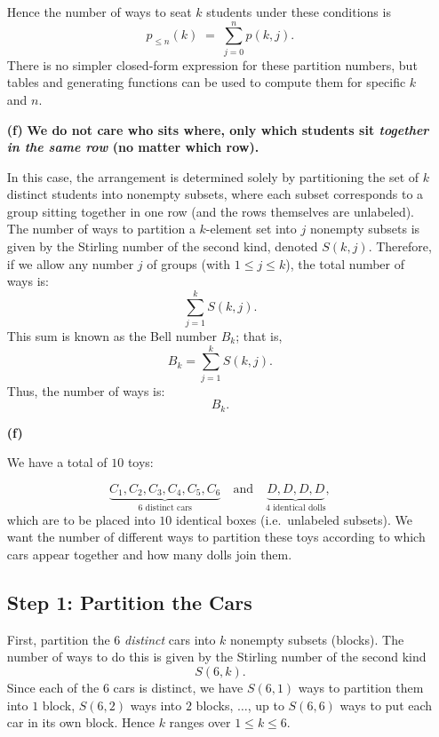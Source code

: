 \documentclass[docmute]{article}
\begin{document}
\begin{enumerate}
    Hence the number of ways to seat \(k\) students under these conditions is
    \[
      \boxed{
        p_{\le n}(k) \;=\;\sum_{j=0}^n p(k,j).
      }
    \]
    There is no simpler closed‐form expression for these partition numbers, but tables and generating functions can be used to compute them for specific \(k\) and \(n\). 
    

    \item[\textbf{(f)}]
    \textbf{We do not care who sits where, only which students sit \emph{together in the same row} (no matter which row).}
    
    In this case, the arrangement is determined solely by partitioning the set of \(k\) distinct students into nonempty subsets, where each subset corresponds to a group sitting together in one row (and the rows themselves are unlabeled). The number of ways to partition a \(k\)-element set into \(j\) nonempty subsets is given by the Stirling number of the second kind, denoted \(S(k,j)\). Therefore, if we allow any number \(j\) of groups (with \(1 \le j \le k\)), the total number of ways is:
    \[
    \sum_{j=1}^{k} S(k,j).
    \]
    This sum is known as the Bell number \(B_k\); that is,
    \[
    B_k = \sum_{j=1}^{k} S(k,j).
    \]
    Thus, the number of ways is:
    \[
    \boxed{B_k.}
    \]
    
    \item[\textbf{(f)}]

    We have a total of \(10\) toys:
    
    \[
    \underbrace{C_1, C_2, C_3, C_4, C_5, C_6}_{\text{6 distinct cars}}
    \quad\text{and}\quad
    \underbrace{D, D, D, D}_{\text{4 identical dolls}},
    \]
    which are to be placed into \(10\) identical boxes (i.e.\ unlabeled subsets). 
    We want the number of different ways to partition these toys according to which cars appear together and how many dolls join them.
    
    \subsection*{Step 1: Partition the Cars}
    
    First, partition the \(6\) \emph{distinct} cars into \(k\) nonempty subsets (blocks).  The number of ways to do this is given by the Stirling number of the second kind 
    \[
    S(6,k).
    \]
    Since each of the \(6\) cars is distinct, we have \(S(6,1)\) ways to partition them into \(1\) block, \(S(6,2)\) ways into \(2\) blocks, \(\dots\), up to \(S(6,6)\) ways to put each car in its own block.  Hence \(k\) ranges over \(1 \le k \le 6\).
    

\end{enumerate}
\end{document}
